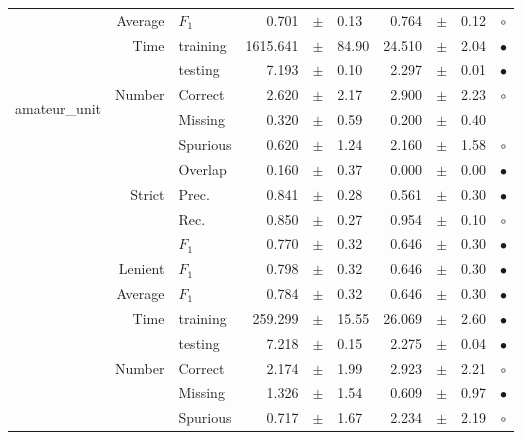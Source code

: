 \begin{longtable}{|r|r|l||rcl|rcl|c|}
\cline{2-10}
  & Average &  $F_1$  & 0.701 &  $\pm$  & 0.13 & 0.764 &  $\pm$  & 0.12 &  $\circ$\\
\cline{2-10}
  & \multirow{2}{*}{Time} &  training  & 1615.641 &  $\pm$  & 84.90 & 24.510 &  $\pm$  & 2.04 &  $\bullet$\\
\cline{3-10}
  &  &  testing  & 7.193 &  $\pm$  & 0.10 & 2.297 &  $\pm$  & 0.01 &  $\bullet$\\
\hline
\hline
\multirow{11}{*}{\begin{sideways}amateur\_unit\end{sideways} } & \multirow{4}{*}{Number} &  Correct  & 2.620 &  $\pm$  & 2.17 & 2.900 &  $\pm$  & 2.23 &  $\circ$\\
\cline{3-10}
  &  &  Missing  & 0.320 &  $\pm$  & 0.59 & 0.200 &  $\pm$  & 0.40 &   \\
\cline{3-10}
  &  &  Spurious  & 0.620 &  $\pm$  & 1.24 & 2.160 &  $\pm$  & 1.58 &  $\circ$\\
\cline{3-10}
  &  &  Overlap  & 0.160 &  $\pm$  & 0.37 & 0.000 &  $\pm$  & 0.00 &  $\bullet$\\
\cline{2-10}
  & \multirow{3}{*}{Strict} &  Prec.  & 0.841 &  $\pm$  & 0.28 & 0.561 &  $\pm$  & 0.30 &  $\bullet$\\
\cline{3-10}
  &  &  Rec.  & 0.850 &  $\pm$  & 0.27 & 0.954 &  $\pm$  & 0.10 &  $\circ$\\
\cline{3-10}
  &  &  $F_1$  & 0.770 &  $\pm$  & 0.32 & 0.646 &  $\pm$  & 0.30 &  $\bullet$\\
\cline{2-10}
  & Lenient &  $F_1$  & 0.798 &  $\pm$  & 0.32 & 0.646 &  $\pm$  & 0.30 &  $\bullet$\\
\cline{2-10}
  & Average &  $F_1$  & 0.784 &  $\pm$  & 0.32 & 0.646 &  $\pm$  & 0.30 &  $\bullet$\\
\cline{2-10}
  & \multirow{2}{*}{Time} &  training  & 259.299 &  $\pm$  & 15.55 & 26.069 &  $\pm$  & 2.60 &  $\bullet$\\
\cline{3-10}
  &  &  testing  & 7.218 &  $\pm$  & 0.15 & 2.275 &  $\pm$  & 0.04 &  $\bullet$\\
\hline
\pagebreak[4]
\hline
\multirow{11}{*}{\begin{sideways}overall\end{sideways} } & \multirow{4}{*}{Number} &  Correct  & 2.174 &  $\pm$  & 1.99 & 2.923 &  $\pm$  & 2.21 &  $\circ$\\
\cline{3-10}
  &  &  Missing  & 1.326 &  $\pm$  & 1.54 & 0.609 &  $\pm$  & 0.97 &  $\bullet$\\
\cline{3-10}
  &  &  Spurious  & 0.717 &  $\pm$  & 1.67 & 2.234 &  $\pm$  & 2.19 &  $\circ$\\

\end{longtable}
